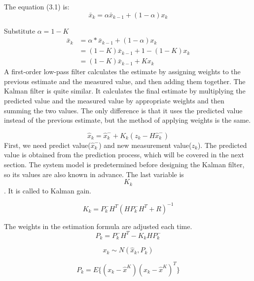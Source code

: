 \documentclass{article}
\numberwithin{equation}{section} %
\begin{document}
The equation (3.1) is:
\[\bar{x}_{k} = \alpha\bar{x}_{k-1} + (1 - \alpha)x_k\]

Substitute \(\alpha = 1 - K\)
\begin{align*}
    \bar{x}_{k} & = \alpha*\bar{x}_{k-1} + (1 - \alpha)x_{k}  \\
                & = (1 - K)\bar{x}_{k-1} + {1 - (1 - K)}x_{k} \\
                & = (1 - K)\bar{x}_{k-1} + Kx_k
\end{align*}
A first-order low-pass filter calculates the estimate by assigning weights to the previous estimate and the measured value,
and then adding them together. The Kalman filter is quite similar. It calculates the final estimate by multiplying the predicted value and the measured value by appropriate weights and then summing the two values.
The only difference is that it uses the predicted value instead of the previous estimate, but the method of applying weights is the same.

\[\hat{x}_{k} = \hat{x}^{-}_{k} + K_{k}(z_k - H\hat{x}^{-}_{k})\]
First, we need predict value(\(\hat{x}^{-}_{k}\)) and new measurement value(\(z_k\)).
The predicted value is obtained from the prediction process, which will be covered in the next section.
The system model is predetermined before designing the Kalman filter, so its values are also known in advance.
The last variable is \[K_k\]. It is called to Kalman gain.

\begin{equation}
    K_k = P_{k}^{-}H^{T}(HP_{k}^{-}H^{T} + R)^{-1}
\end{equation}

The weights in the estimation formula are adjusted each time.
\begin{equation}
    P_k = P_{k}^{-}H^{T} - K_{k}HP_{k}^{-}
\end{equation}

\begin{equation}
    x_{k} \sim N(\hat{x}_k, P_k)
\end{equation}

\begin{equation}
    P_{k} = E\{(x_{k} - \hat{x}^{K})(x_{k} - \hat{x}^{K})^{T}\}
\end{equation}
\end{document}
